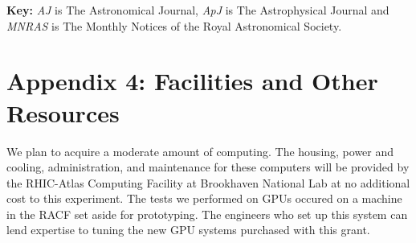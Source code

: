 \documentclass[12pt]{article}
\begin{document}

\newpage
{}
\renewcommand{\refname}{\section*{Appendix 3: Bibliography for Narrative}\label{app:bib}}


\vspace{5mm}
\noindent
{\bf Key:} {\it AJ} is The Astronomical Journal, {\it ApJ} is The 
Astrophysical Journal and {\it MNRAS} is The Monthly Notices of the Royal
Astronomical Society.






\newpage
{}
\section*{Appendix 4: Facilities and Other Resources}

We plan to acquire a moderate amount of computing.  The housing, power and
cooling, administration, and maintenance for these computers will be provided
by the RHIC-Atlas Computing Facility at Brookhaven National Lab at no
additional cost to this experiment.	The tests we performed on GPUs occured on a
machine in the RACF set aside for prototyping.  The engineers who set up this
system can lend expertise to tuning the new GPU systems purchased with this
grant.
\end{document}
